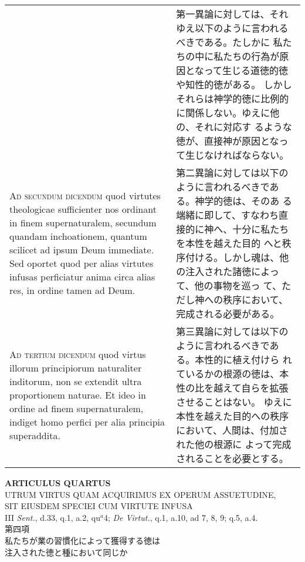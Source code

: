 \documentclass[10pt]{jsarticle}
\begin{document}
\begin{longtable}{p{21em}p{21em}}
&

 第一異論に対しては、それゆえ以下のように言われるべきである。たしかに
 私たちの中に私たちの行為が原因となって生じる道徳的徳や知性的徳がある。
 しかしそれらは神学的徳に比例的に関係しない。ゆえに他の、それに対応す
 るような徳が、直接神が原因となって生じなければならない。
 
\\

{\scshape Ad secundum dicendum} quod virtutes theologicae sufficienter
nos ordinant in finem supernaturalem, secundum quandam inchoationem,
quantum scilicet ad ipsum Deum immediate. Sed oportet quod per alias
virtutes infusas perficiatur anima circa alias res, in ordine tamen ad
Deum.

&

 第二異論に対しては以下のように言われるべきである。神学的徳は、そのあ
 る端緒に即して、すなわち直接的に神へ、十分に私たちを本性を越えた目的
 へと秩序付ける。しかし魂は、他の注入された諸徳によって、他の事物を巡っ
 て、ただし神への秩序において、完成される必要がある。
 
\\



{\scshape Ad tertium dicendum} quod virtus illorum principiorum
naturaliter inditorum, non se extendit ultra proportionem naturae. Et
ideo in ordine ad finem supernaturalem, indiget homo perfici per alia
principia superaddita.

&

 第三異論に対しては以下のように言われるべきである。本性的に植え付けら
 れているかの根源の徳は、本性の比を越えて自らを拡張させることはない。
 ゆえに本性を越えた目的への秩序において、人間は、付加された他の根源に
 よって完成されることを必要とする。


\end{longtable}
\newpage

\begin{center}
{\Large {\bf ARTICULUS QUARTUS}}\\
{\large UTRUM VIRTUS QUAM ACQUIRIMUS EX OPERUM ASSUETUDINE,\\SIT EIUSDEM SPECIEI CUM VIRTUTE INFUSA}\\
{\footnotesize III {\itshape Sent.}, d.33, q.1, a.2, qu$^{a}$4; {\itshape De Virtut.}, q.1, a.10, ad 7, 8, 9; q.5, a.4.}\\
{\Large 第四項\\私たちが業の習慣化によって獲得する徳は\\注入された徳と種において同じか}
\end{center}
\end{document}
